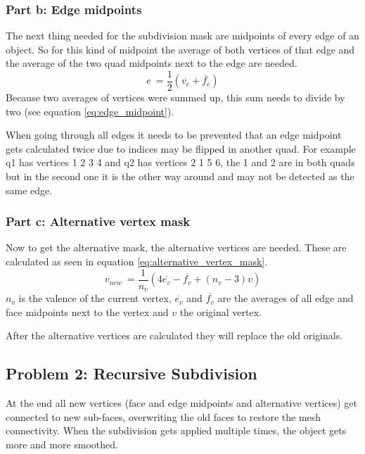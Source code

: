 \documentclass[11.5pt,oneside,a4paper]{scrartcl}
\newcounter{ct}
\begin{document}
\subsubsection{Part b: Edge midpoints}
The next thing needed for the subdivision mask are midpoints of every edge of an object. So for this kind of midpoint the average of both vertices of that edge and the average of the two quad midpoints next to the edge are needed.
\begin{equation} \label{eq:edge_midpoint}
        e \ = \frac{1}{2} ( \overline{v_{e}} + \overline{f_{e}} )
\end{equation} 
Because two averages of vertices were summed up, this sum needs to divide by two (see equation \ref{eq:edge_midpoint}).

When going through all edges it needs to be prevented that an edge midpoint gets calculated twice due to indices may be flipped in another quad. For example q1 has vertices 1 2 3 4 and q2 has vertices 2 1 5 6, the 1 and 2 are in both quads but in the second one it is the other way around and may not be detected as the same edge.

\subsubsection{Part c: Alternative vertex mask}
Now to get the alternative mask, the alternative vertices are needed. These are calculated as seen in equation \ref{eq:alternative_vertex_mask}.
\begin{equation} \label{eq:alternative_vertex_mask}
        v_{new} \ = \frac{1}{n_{v}} ( 4 \overline{e_{v}} - \overline{f_{v}} + (n_{v}-3) v)
\end{equation} 
$n_{v}$ is the valence of the current vertex, $\overline{e_{v}}$ and $\overline{f_{v}}$ are the averages of all edge and face midpoints next to the vertex and $v$ the original vertex.

After the alternative vertices are calculated they will replace the old originals.

\subsection{Problem 2: Recursive Subdivision}
At the end all new vertices (face and edge midpoints and alternative vertices) get connected to new sub-faces, overwriting the old faces to restore the mesh connectivity. When the subdivision gets applied multiple times, the object gets more and more smoothed.
\end{document}
